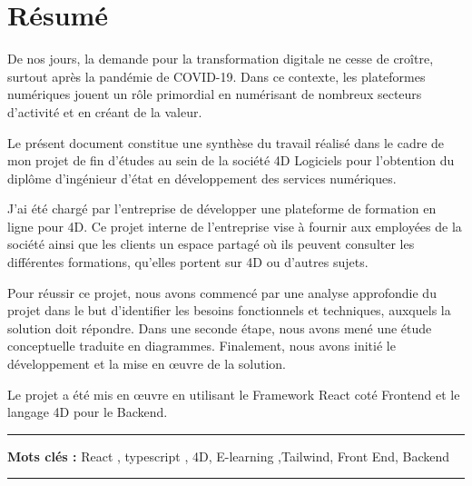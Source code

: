 \chapter*{Résumé}


De nos jours, la demande pour la transformation digitale ne cesse de croître, surtout après la pandémie de COVID-19. Dans ce contexte, les plateformes numériques jouent un rôle primordial en numérisant de nombreux secteurs d'activité et en créant de la valeur.
\vspace{10pt}

Le présent document constitue une synthèse du travail réalisé dans le cadre de mon projet de fin d’études au sein de la société 4D Logiciels pour l’obtention du diplôme d’ingénieur d’état en développement des services numériques.

\vspace{10pt}

J'ai été chargé par l'entreprise de développer une plateforme de formation en ligne pour 4D. Ce projet interne de l'entreprise vise à fournir aux employées de la société ainsi que les clients un espace partagé où ils peuvent consulter les différentes formations, qu’elles portent sur 4D ou d’autres sujets.

\vspace{10pt}

Pour réussir ce projet, nous avons commencé par une analyse approfondie du projet dans le but d’identifier les besoins fonctionnels et techniques, auxquels la solution doit répondre. Dans une seconde étape, nous avons mené une étude conceptuelle traduite en diagrammes. Finalement, nous avons initié le développement et la mise en œuvre de la solution.

\vspace{10pt}

Le projet a été mis en œuvre en utilisant le Framework React coté Frontend et le langage 4D pour le Backend.

\vspace{10pt}


\noindent\rule[2pt]{\textwidth}{0.5pt}

{\textbf{Mots clés :}}
React , typescript , 4D, E-learning ,Tailwind, Front End, Backend
\\
\noindent\rule[2pt]{\textwidth}{0.5pt}